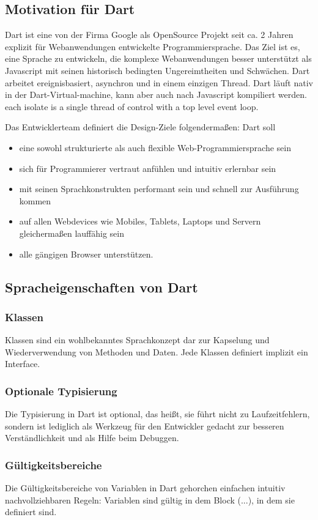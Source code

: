 \subsection{Motivation für Dart}
Dart ist eine von der Firma Google als OpenSource Projekt seit ca. 2 Jahren explizit für Webanwendungen entwickelte Programmiersprache. Das Ziel ist es, eine Sprache zu entwickeln, die komplexe Webanwendungen besser unterstützt als Javascript mit seinen historisch bedingten Ungereimtheiten und Schwächen.
Dart arbeitet ereignisbasiert, asynchron und in einem einzigen Thread. Dart läuft nativ in der Dart-Virtual-machine, kann aber auch nach Javascript kompiliert werden.
 each isolate is a single thread of control with a top level event loop.

Das Entwicklerteam definiert die Design-Ziele folgendermaßen:
Dart soll
\begin{itemize}   
\item eine sowohl strukturierte als auch flexible Web-Programmiersprache sein
\item sich für Programmierer vertraut anfühlen und intuitiv erlernbar sein 
\item mit seinen Sprachkonstrukten performant sein und schnell zur Ausführung kommen
\item auf allen Webdevices wie Mobiles, Tablets, Laptops und Servern gleichermaßen lauffähig sein
\item alle gängigen Browser unterstützen.
\end{itemize}
 
\subsection{Spracheigenschaften von Dart}\label{s.Spracheigenschaften von Dart}
\subsubsection{Klassen}
Klassen sind ein wohlbekanntes Sprachkonzept dar zur Kapselung und Wiederverwendung von Methoden und Daten. Jede Klassen definiert implizit ein Interface.
\subsubsection{Optionale Typisierung}
Die Typisierung in Dart ist optional, das heißt, sie führt nicht zu Laufzeitfehlern, sondern ist lediglich als Werkzeug für den Entwickler gedacht zur besseren Verständlichkeit und als Hilfe beim Debuggen.\subsubsection{Gültigkeitsbereiche}
Die Gültigkeitsbereiche von Variablen in Dart gehorchen einfachen intuitiv nachvollziehbaren Regeln: Variablen sind gültig in dem Block ({...}), in dem sie definiert sind.
